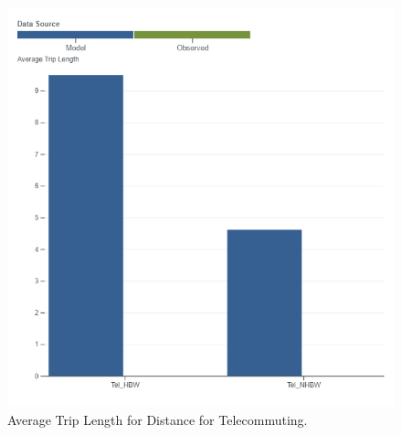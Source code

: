 \documentclass[
  letterpaper,
  DIV=11,
  numbers=noendperiod]{scrreprt}
\begin{document}
\begin{figure}[H]

{\centering \includegraphics[width=\textwidth,height=0.4\textheight]{v9x/v900/validation/_pictures/5-plot6.png}

}

\caption{\label{fig-pdf-dist-tele}Average Trip Length for Distance for
Telecommuting.}

\end{figure}
\end{document}
